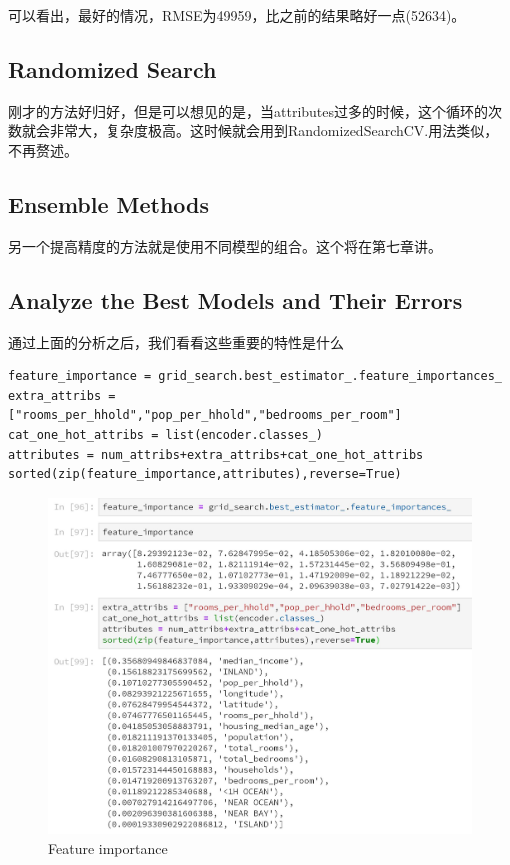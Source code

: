 \documentclass[UTF8]{ctexart}
\begin{document}
可以看出，最好的情况，RMSE为49959，比之前的结果略好一点(52634)。

\subsection{Randomized Search}
刚才的方法好归好，但是可以想见的是，当attributes过多的时候，这个循环的次数就会非常大，复杂度极高。这时候就会用到RandomizedSearchCV.用法类似，不再赘述。

\subsection{Ensemble Methods}

另一个提高精度的方法就是使用不同模型的组合。这个将在第七章讲。

\subsection{Analyze the Best Models and Their Errors}

通过上面的分析之后，我们看看这些重要的特性是什么


\begin{lstlisting}
feature_importance = grid_search.best_estimator_.feature_importances_
extra_attribs = ["rooms_per_hhold","pop_per_hhold","bedrooms_per_room"]
cat_one_hot_attribs = list(encoder.classes_)
attributes = num_attribs+extra_attribs+cat_one_hot_attribs
sorted(zip(feature_importance,attributes),reverse=True)
\end{lstlisting}

\begin{figure}[H]
\centering
\includegraphics[width = 5in]{feature_imp.JPG}
\caption{Feature importance}
\end{figure}
\end{document}
